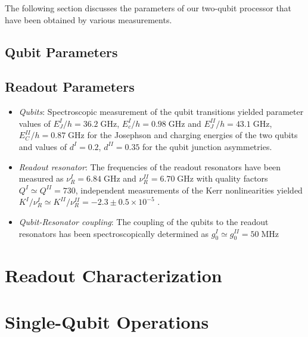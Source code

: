 The following section discusses the parameters of our two-qubit processor that have been obtained by various measurements.

\subsection{Qubit Parameters}

\subsection{Readout Parameters}

\begin{itemize}
\item \textit{Qubits}: Spectroscopic measurement of the qubit transitions yielded parameter values of $E_J^I / h = 36.2\; \mathrm{GHz}$, $E_c^I / h = 0.98 \; \mathrm{GHz}$ and $E_J^{II} / h = 43.1\; \mathrm{GHz}$, $E_C^{II} / h = 0.87 \; \mathrm{GHz}$ for the Josephson and charging energies of the two qubits and values of $d^I = 0.2$, $d^{II} =  0.35$ for the qubit junction asymmetries.
\item \textit{Readout resonator}: The frequencies of the readout resonators have been measured as $\nu_R^I = 6.84 \; \mathrm{GHz}$ and $\nu_R^{II} = 6.70 \; \mathrm{GHz}$ with quality factors $Q^I \simeq Q^{II} = 730$, independent measurements of the Kerr nonlinearities yielded $K^I / \nu_R^I \simeq K^{II} / \nu_R^{II} = -2.3\pm 0.5 \times 10^{-5}$ .
\item \textit{Qubit-Resonator coupling}: The coupling of the qubits to the readout resonators has been spectroscopically determined as $g_0^I \simeq g_0^{II} = 50 \; \mathrm{MHz}$
\end{itemize}

\section{Readout Characterization}


\section{Single-Qubit Operations}




